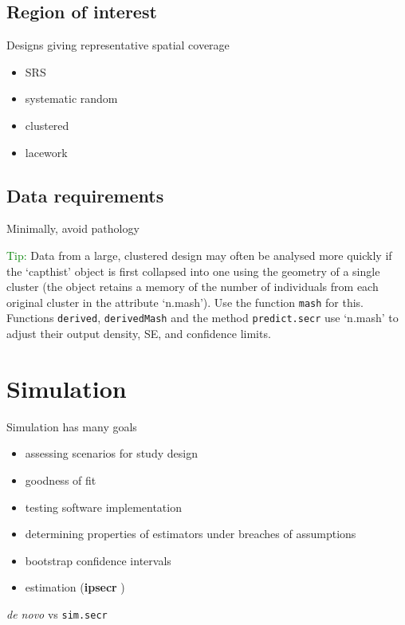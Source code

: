 \documentclass[
]{book}
\providecommand{\tightlist}{%
  \setlength{\itemsep}{0pt}\setlength{\parskip}{0pt}}
\begin{document}
\section{Region of interest}\label{region-of-interest}

Designs giving representative spatial coverage

\begin{itemize}
\tightlist
\item
  SRS
\item
  systematic random
\item
  clustered
\item
  lacework
\end{itemize}

\section{Data requirements}\label{data-requirements}

Minimally, avoid pathology

\textcolor{green}{Tip:} Data from a large, clustered design may often be analysed more quickly if the `capthist' object is first collapsed into one using the geometry of a single cluster (the object retains a memory of the number of individuals from each original cluster in the attribute `n.mash'). Use the function \texttt{mash} for this. Functions \texttt{derived}, \texttt{derivedMash} and the method \texttt{predict.secr} use `n.mash' to adjust their output density, SE, and confidence limits.

\chapter{Simulation}\label{Simulation}

Simulation has many goals

\begin{itemize}
\tightlist
\item
  assessing scenarios for study design
\item
  goodness of fit
\item
  testing software implementation
\item
  determining properties of estimators under breaches of assumptions
\item
  bootstrap confidence intervals
\item
  estimation (\textbf{ipsecr} )
\end{itemize}

\emph{de novo} vs \texttt{sim.secr}
\end{document}
